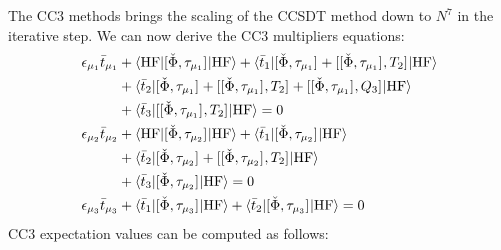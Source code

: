The \acrshort*{CC3} methods brings the scaling of the \acrshort*{CCSDT}
method down to $N^7$ in the iterative step.
We can now derive the \acrshort*{CC3} multipliers equations:
\begin{subequations}\label{eq:cc3-multipliers}
  \begin{align}
    \epsilon_{\mu_1}\bar{t}_{\mu_1} &+
     \braket{\mathrm{HF} | [ \check{\Phi}, \tau_{\mu_1} ]^{} | \mathrm{HF}}
   + \braket{\bar{t}_{1} |
       [ \check{\Phi}, \tau_{\mu_1} ]^{}
     + [ [ \check{\Phi}, \tau_{\mu_1} ]^{}, T_2 ]^{}
     | \mathrm{HF}} \nonumber \\
   &+ \braket{\bar{t}_{2} |
       [ \check{\Phi}, \tau_{\mu_1} ]^{}
     + [ [ \check{\Phi}, \tau_{\mu_1} ]^{}, T_2 ]^{}
     + [ [ \check{\Phi}, \tau_{\mu_1} ]^{}, Q_3 ]^{}
   | \mathrm{HF}} \nonumber \\
   &+ \braket{\bar{t}_{3} |
      [ [ \check{\Phi}, \tau_{\mu_1} ]^{}, T_2 ]^{}
     | \mathrm{HF}} = 0 \label{eq:cc3-singles-multipliers} \\
    \epsilon_{\mu_2}\bar{t}_{\mu_2} &+
    \braket{\mathrm{HF} | [ \check{\Phi}, \tau_{\mu_2} ]^{} | \mathrm{HF}}
   + \braket{\bar{t}_{1} |
       [ \check{\Phi}, \tau_{\mu_2} ]^{}
     | \mathrm{HF}} \nonumber \\
  &+ \braket{\bar{t}_{2} |
       [ \check{\Phi}, \tau_{\mu_2} ]^{}
     + [ [ \check{\Phi}, \tau_{\mu_2} ]^{}, T_2 ]^{}
     | \mathrm{HF}} \nonumber \\
  &+ \braket{\bar{t}_{3} |
       [ \check{\Phi}, \tau_{\mu_2} ]^{}
     | \mathrm{HF}}
    = 0 \label{eq:cc3-doubles-multipliers} \\
    \epsilon_{\mu_3}\bar{t}_{\mu_3} &+
    \braket{\bar{t}_{1} |
       [ \check{\Phi}, \tau_{\mu_3} ]^{}
     | \mathrm{HF}}
  + \braket{\bar{t}_{2} |
       [ \check{\Phi}, \tau_{\mu_3} ]^{}
     | \mathrm{HF}}
    = 0 \label{eq:cc3-triples-multipliers}
  \end{align}
\end{subequations}
\acrshort*{CC3} expectation values can be computed as follows:
